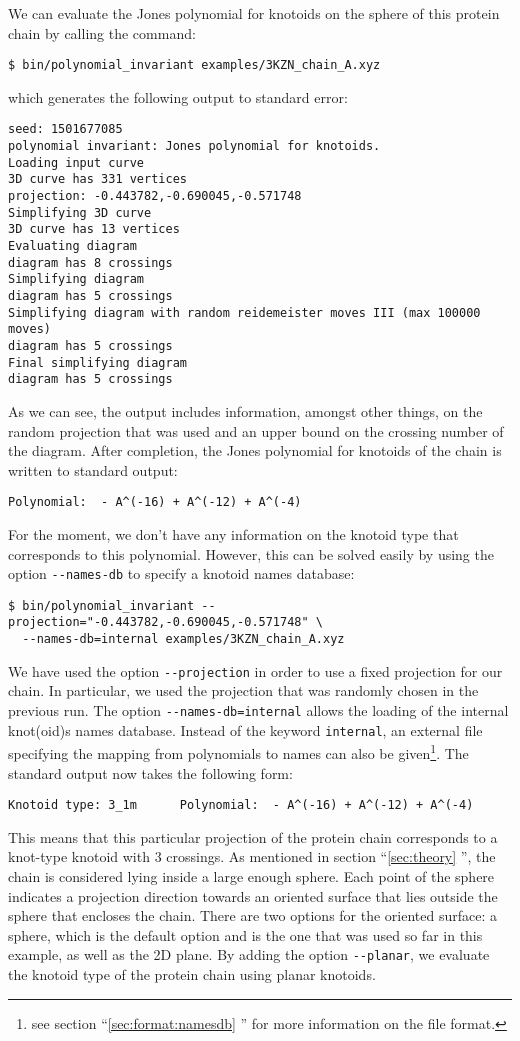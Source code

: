 We can evaluate the Jones polynomial for knotoids on the sphere of this protein chain by calling the command:
\begin{lstlisting}
$ bin/polynomial_invariant examples/3KZN_chain_A.xyz 
\end{lstlisting}
which generates the following output to standard error:
\begin{lstlisting}
seed: 1501677085
polynomial invariant: Jones polynomial for knotoids.
Loading input curve
3D curve has 331 vertices
projection: -0.443782,-0.690045,-0.571748
Simplifying 3D curve
3D curve has 13 vertices
Evaluating diagram
diagram has 8 crossings
Simplifying diagram
diagram has 5 crossings
Simplifying diagram with random reidemeister moves III (max 100000 moves)
diagram has 5 crossings
Final simplifying diagram
diagram has 5 crossings
\end{lstlisting}
As we can see, the output includes information, amongst other things, on the random projection that was used and an upper bound on the crossing number of the diagram. After completion, the Jones polynomial for knotoids of the chain is written to standard output:
\begin{lstlisting}
Polynomial:  - A^(-16) + A^(-12) + A^(-4)
\end{lstlisting}
For the moment, we don't have any information on the knotoid type that corresponds to this polynomial. However, this can be solved easily by using the option \lstinline{--names-db} to specify a knotoid names database:
\begin{lstlisting}
$ bin/polynomial_invariant --projection="-0.443782,-0.690045,-0.571748" \
  --names-db=internal examples/3KZN_chain_A.xyz
\end{lstlisting}
We have used the option \lstinline{--projection} in order to use a fixed projection for our chain. In particular, we used the projection that was randomly chosen in the previous run. The option \lstinline{--names-db=internal} allows the loading of the internal knot(oid)s names database. Instead of the keyword \lstinline{internal}, an external file specifying the mapping from polynomials to names can also be given\footnote{see section ``\ref{sec:format:namesdb} '' for more information on the file format.}. The standard output now takes the following form:
\begin{lstlisting}
Knotoid type: 3_1m      Polynomial:  - A^(-16) + A^(-12) + A^(-4)
\end{lstlisting}
This means that this particular projection of the protein chain corresponds to a knot-type knotoid with 3 crossings. As mentioned in section ``\ref{sec:theory} '', the chain is considered lying inside a large enough sphere. Each point of the sphere indicates a projection direction towards an oriented surface that lies outside the sphere that encloses the chain. There are two options for the oriented surface: a sphere, which is the default option and is the one that was used so far in this example, as well as the 2D plane. By adding the option \lstinline{--planar}, we evaluate the knotoid type of the protein chain using planar knotoids.
